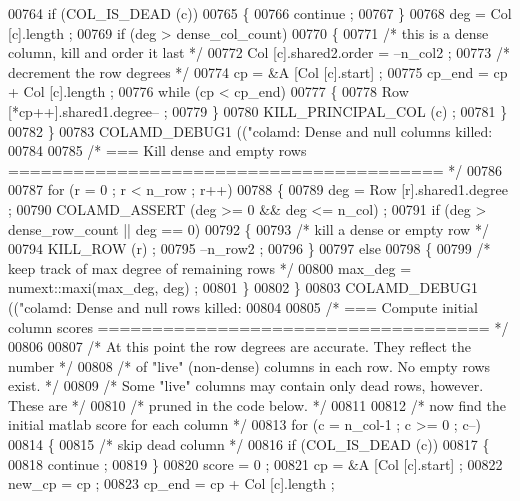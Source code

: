 \begin{DoxyCode}
{{{{{{{{{{{{00764     \textcolor{keywordflow}{if} (COL\_IS\_DEAD (c))
00765     \{
00766       continue ;
00767     \}
00768     deg = Col [c].length ;
00769     \textcolor{keywordflow}{if} (deg > dense\_col\_count)
00770     \{
00771       \textcolor{comment}{/* this is a dense column, kill and order it last */}
00772       Col [c].shared2.order = --n\_col2 ;
00773       \textcolor{comment}{/* decrement the row degrees */}
00774       cp = &A [Col [c].start] ;
00775       cp\_end = cp + Col [c].length ;
00776       \textcolor{keywordflow}{while} (cp < cp\_end)
00777       \{
00778     Row [*cp++].shared1.degree-- ;
00779       \}
00780       KILL\_PRINCIPAL\_COL (c) ;
00781     \}
00782   \}
00783   COLAMD\_DEBUG1 ((\textcolor{stringliteral}{"colamd: Dense and null columns killed: %
00784 
00785   \textcolor{comment}{/* === Kill dense and empty rows ======================================== */}
00786 
00787   \textcolor{keywordflow}{for} (r = 0 ; r < n\_row ; r++)
00788   \{
00789     deg = Row [r].shared1.degree ;
00790     COLAMD\_ASSERT (deg >= 0 && deg <= n\_col) ;
00791     \textcolor{keywordflow}{if} (deg > dense\_row\_count || deg == 0)
00792     \{
00793       \textcolor{comment}{/* kill a dense or empty row */}
00794       KILL\_ROW (r) ;
00795       --n\_row2 ;
00796     \}
00797     \textcolor{keywordflow}{else}
00798     \{
00799       \textcolor{comment}{/* keep track of max degree of remaining rows */}
00800       max\_deg = numext::maxi(max\_deg, deg) ;
00801     \}
00802   \}
00803   COLAMD\_DEBUG1 ((\textcolor{stringliteral}{"colamd: Dense and null rows killed: %
00804 
00805   \textcolor{comment}{/* === Compute initial column scores ==================================== */}
00806 
00807   \textcolor{comment}{/* At this point the row degrees are accurate.  They reflect the number */}
00808   \textcolor{comment}{/* of "live" (non-dense) columns in each row.  No empty rows exist. */}
00809   \textcolor{comment}{/* Some "live" columns may contain only dead rows, however.  These are */}
00810   \textcolor{comment}{/* pruned in the code below. */}
00811 
00812   \textcolor{comment}{/* now find the initial matlab score for each column */}
00813   \textcolor{keywordflow}{for} (c = n\_col-1 ; c >= 0 ; c--)
00814   \{
00815     \textcolor{comment}{/* skip dead column */}
00816     \textcolor{keywordflow}{if} (COL\_IS\_DEAD (c))
00817     \{
00818       continue ;
00819     \}
00820     score = 0 ;
00821     cp = &A [Col [c].start] ;
00822     new\_cp = cp ;
00823     cp\_end = cp + Col [c].length ;
}}}}}}}}}}}}}}
\end{DoxyCode}

